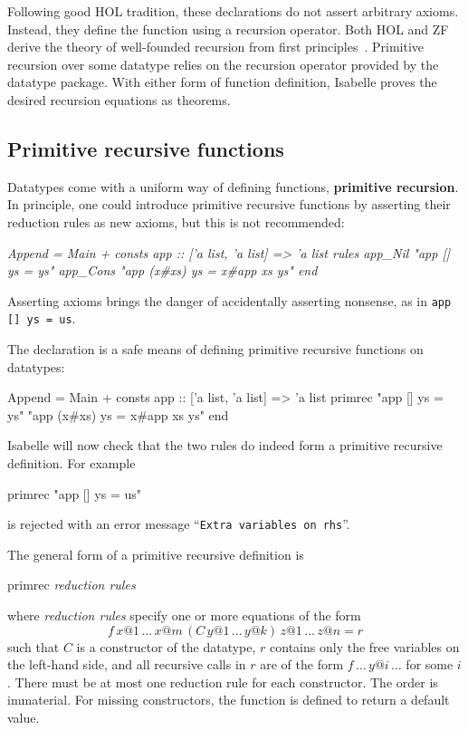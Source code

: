Following good HOL tradition, these declarations do not assert arbitrary
axioms.  Instead, they define the function using a recursion operator.  Both
HOL and ZF derive the theory of well-founded recursion from first
principles~\cite{paulson-set-II}.  Primitive recursion over some datatype
relies on the recursion operator provided by the datatype package.  With
either form of function definition, Isabelle proves the desired recursion
equations as theorems.


\subsection{Primitive recursive functions}
\label{sec:HOL:primrec}

Datatypes come with a uniform way of defining functions, {\bf primitive
  recursion}.  In principle, one could introduce primitive recursive functions
by asserting their reduction rules as new axioms, but this is not recommended:
\begin{ttbox}\slshape
Append = Main +
consts app :: ['a list, 'a list] => 'a list
rules 
   app_Nil   "app [] ys = ys"
   app_Cons  "app (x#xs) ys = x#app xs ys"
end
\end{ttbox}
Asserting axioms brings the danger of accidentally asserting nonsense, as
in \verb$app [] ys = us$.

The  declaration is a safe means of defining primitive
recursive functions on datatypes:
\begin{ttbox}
Append = Main +
consts app :: ['a list, 'a list] => 'a list
primrec
   "app [] ys = ys"
   "app (x#xs) ys = x#app xs ys"
end
\end{ttbox}
Isabelle will now check that the two rules do indeed form a primitive
recursive definition.  For example
\begin{ttbox}
primrec
    "app [] ys = us"
\end{ttbox}
is rejected with an error message ``\texttt{Extra variables on rhs}''.

\bigskip

The general form of a primitive recursive definition is
\begin{ttbox}
primrec
    {\it reduction rules}
\end{ttbox}
where \textit{reduction rules} specify one or more equations of the form
\[ f \, x@1 \, \dots \, x@m \, (C \, y@1 \, \dots \, y@k) \, z@1 \,
\dots \, z@n = r \] such that $C$ is a constructor of the datatype, $r$
contains only the free variables on the left-hand side, and all recursive
calls in $r$ are of the form $f \, \dots \, y@i \, \dots$ for some $i$.  There
must be at most one reduction rule for each constructor.  The order is
immaterial.  For missing constructors, the function is defined to return a
default value.  


